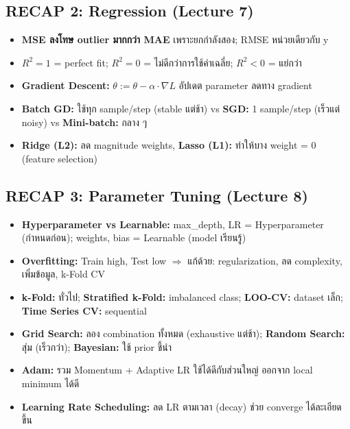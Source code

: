 \documentclass[a4paper,12pt]{article}
\begin{document}
\subsection*{RECAP 2: Regression (Lecture 7)}
\begin{itemize}
    \item \textbf{MSE ลงโทษ outlier มากกว่า MAE} เพราะยกกำลังสอง; RMSE หน่วยเดียวกับ y
    \item \textbf{$R^2 = 1$} = perfect fit; $R^2 = 0$ = ไม่ดีกว่าการใช้ค่าเฉลี่ย; $R^2 < 0$ = แย่กว่า
    \item \textbf{Gradient Descent:} $\theta := \theta - \alpha \cdot \nabla L$ อัปเดต parameter ลดทาง gradient
    \item \textbf{Batch GD:} ใช้ทุก sample/step (stable แต่ช้า) vs \textbf{SGD:} 1 sample/step (เร็วแต่ noisy) vs \textbf{Mini-batch:} กลาง ๆ
    \item \textbf{Ridge (L2):} ลด magnitude weights, \textbf{Lasso (L1):} ทำให้บาง weight = 0 (feature selection)
\end{itemize}

\subsection*{RECAP 3: Parameter Tuning (Lecture 8)}
\begin{itemize}
    \item \textbf{Hyperparameter vs Learnable:} max\_depth, LR = Hyperparameter (กำหนดก่อน); weights, bias = Learnable (model เรียนรู้)
    \item \textbf{Overfitting:} Train high, Test low $\Rightarrow$ แก้ด้วย: regularization, ลด complexity, เพิ่มข้อมูล, k-Fold CV
    \item \textbf{k-Fold:} ทั่วไป; \textbf{Stratified k-Fold:} imbalanced class; \textbf{LOO-CV:} dataset เล็ก; \textbf{Time Series CV:} sequential
    \item \textbf{Grid Search:} ลอง combination ทั้งหมด (exhaustive แต่ช้า); \textbf{Random Search:} สุ่ม (เร็วกว่า); \textbf{Bayesian:} ใช้ prior ชี้นำ
    \item \textbf{Adam:} รวม Momentum + Adaptive LR ใช้ได้ดีกับส่วนใหญ่ ออกจาก local minimum ได้ดี
    \item \textbf{Learning Rate Scheduling:} ลด LR ตามเวลา (decay) ช่วย converge ได้ละเอียดขึ้น
\end{itemize}
\end{document}

